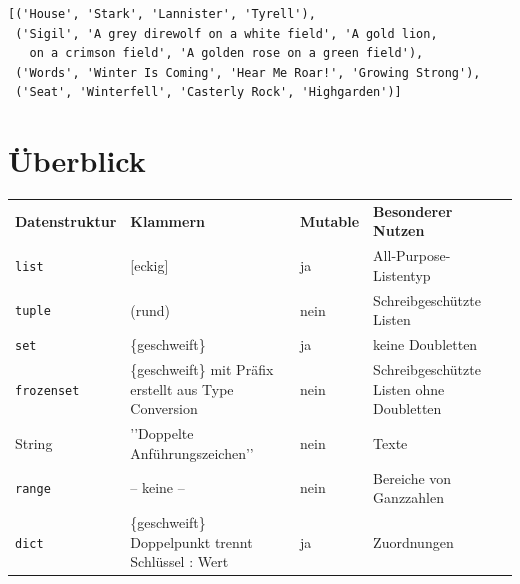 \begin{cmdbox}[Ausgabe]
\begin{verbatim}
[('House', 'Stark', 'Lannister', 'Tyrell'), 
 ('Sigil', 'A grey direwolf on a white field', 'A gold lion, 
   on a crimson field', 'A golden rose on a green field'), 
 ('Words', 'Winter Is Coming', 'Hear Me Roar!', 'Growing Strong'), 
 ('Seat', 'Winterfell', 'Casterly Rock', 'Highgarden')]  
\end{verbatim}
\end{cmdbox}

\section{Überblick}
\begin{table}[h!]


\begin{tabularx}
	{\linewidth}
	{DKMN}
	\toprule[1.5pt]
	
	\textbf{Datenstruktur} &
	\textbf{Klammern} &
	\textbf{Mutable} & 
	\textbf{Besonderer Nutzen} \\
	
	\texttt{list} &
	[eckig] &
	ja &
	All-Purpose-Listentyp \\
	
	\texttt{tuple} &
	(rund) &
	nein &
	Schreibgeschützte Listen \\
	
	\texttt{set} &
	\{geschweift\} &
	ja &
	keine Doubletten \\
	
	\texttt{frozenset} &
	\{geschweift\} mit Präfix\newline
	erstellt aus Type Conversion &
	nein &
	Schreibgeschützte Listen ohne Doubletten \\
	
	String &
	'{}'Doppelte Anführungszeichen'{}' &
	nein &
	Texte \\
	
	\texttt{range} &
	-- keine -- &
	nein &
	Bereiche von Ganzzahlen \\
	
	\texttt{dict} &
	\{geschweift\}\newline
	Doppelpunkt trennt Schlüssel : Wert &
	ja &
	Zuordnungen \\
	
	\bottomrule[1.5pt]
\end{tabularx}
\end{table}


